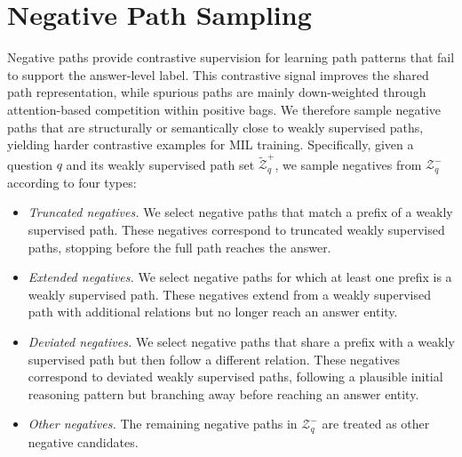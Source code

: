 \documentclass{article}
\begin{document}
\section{Negative Path Sampling}\label{app:neg_sampling}

Negative paths provide contrastive supervision for learning path patterns that fail to support the answer-level label.
This contrastive signal improves the shared path representation, while spurious paths are mainly down-weighted through attention-based competition within positive bags. We therefore sample negative paths that are structurally or semantically close to weakly supervised paths, yielding harder contrastive examples for MIL training.
Specifically, given a question $q$ and its weakly supervised path set $\widetilde{\mathcal{Z}}_q^{+}$, we sample negatives from $\mathcal{Z}_q^{-}$ according to four types:

\begin{itemize}
    \item \textit{Truncated negatives.}
    We select negative paths that match a prefix of a weakly supervised path.
    These negatives correspond to truncated weakly supervised paths, stopping before the full path reaches the answer.
        
    \item \textit{Extended negatives.}
    We select negative paths for which at least one prefix is a weakly supervised path. These negatives extend from a weakly supervised path with additional relations but no longer reach an answer entity.
    
    \item \textit{Deviated negatives.}
    We select negative paths that share a prefix with a weakly supervised path but then follow a different relation.
    These negatives correspond to deviated weakly supervised paths, following a plausible initial reasoning pattern but branching away before reaching an answer entity.

    \item \textit{Other negatives.}
    The remaining negative paths in $\mathcal{Z}_q^{-}$ are treated as other negative candidates.
\end{itemize}
\end{document}
